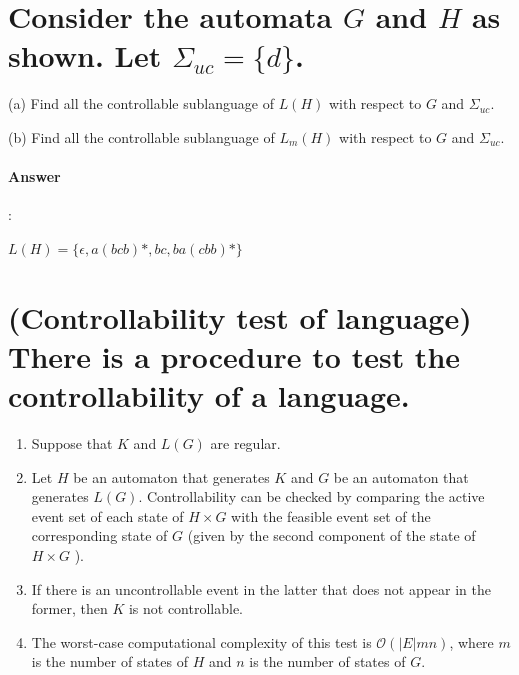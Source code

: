 \documentclass{article}
\begin{document}
\section{Consider the automata $G$ and $H$ as shown. Let $\Sigma_{uc} = \{d\}$.}
(a) Find all the controllable sublanguage of $L(H)$ with respect to $G$ and $\Sigma_{u c}$.

(b) Find all the controllable sublanguage of $L_m(H)$ with respect to $G$ and $\Sigma_{u c}$.

\paragraph{Answer}:

$L(H)=\{ \epsilon, a(bcb)*, bc, ba(cbb)* \}$



\section{(Controllability test of language) There is a procedure to test the controllability of a language.}
\begin{enumerate}
  \item Suppose that $K$ and $L(G)$ are regular.
  \item Let $H$ be an automaton that generates $K$ and $G$ be an automaton that generates $L(G)$. Controllability can be checked by comparing the active event set of each state of $H \times G$ with the feasible event set of the corresponding state of $G$ (given by the second component of the state of $H \times G$ ).
  \item If there is an uncontrollable event in the latter that does not appear in the former, then $K$ is not controllable.
  \item The worst-case computational complexity of this test is $\mathcal{O}(|E| m n)$, where $m$ is the number of states of $H$ and $n$ is the number of states of $G$.
\end{enumerate}
\end{document}
